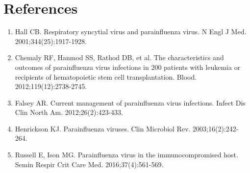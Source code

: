 \section*{References}
\begin{enumerate}
  \item Hall CB. Respiratory syncytial virus and parainfluenza virus. N Engl J Med. 2001;344(25):1917-1928.
  \item Chemaly RF, Hanmod SS, Rathod DB, et al. The characteristics and outcomes of parainfluenza virus infections in 200 patients with leukemia or recipients of hematopoietic stem cell transplantation. Blood. 2012;119(12):2738-2745.
  \item Falsey AR. Current management of parainfluenza virus infections. Infect Dis Clin North Am. 2012;26(2):423-433.
  \item Henrickson KJ. Parainfluenza viruses. Clin Microbiol Rev. 2003;16(2):242-264.
  \item Russell E, Ison MG. Parainfluenza virus in the immunocompromised host. Semin Respir Crit Care Med. 2016;37(4):561-569.
\end{enumerate}

\clearpage
